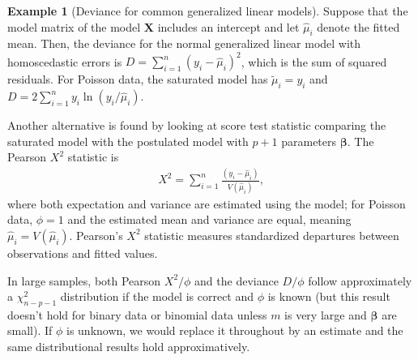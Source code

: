 \documentclass[
  11pt,
  letterpaper,
]{book}
\theoremstyle{definition}
\theoremstyle{definition}
\newtheorem{example}{Example}[chapter]
\theoremstyle{definition}
\theoremstyle{remark}
\begin{document}
\begin{example}[Deviance for common generalized linear models]
\protect\hypertarget{exm:devglm}{}{\label{exm:devglm} {} }Suppose that the model matrix of the model \(\mathbf{X}\) includes an intercept and let \(\widehat{\mu}_i\) denote the fitted mean. Then, the deviance for the normal generalized linear model with homoscedastic errors is \(D = \sum_{i=1}^n (y_i - \widehat{\mu}_i)^2\), which is the sum of squared residuals. For Poisson data, the saturated model has \(\widetilde{\mu}_i=y_i\) and \(D= 2\sum_{i=1}^n y_i \ln(y_i/\widehat{\mu}_i)\).
\end{example}

Another alternative is found by looking at score test statistic comparing the saturated model with the postulated model with \(p+1\) parameters \(\boldsymbol{\beta}\). The Pearson \(X^2\) statistic is
\begin{align*}
 X^2= \sum_{i=1}^n \frac{(y_i-\widehat{\mu}_i)}{ V(\widehat{\mu}_i)},
\end{align*}
where both expectation and variance are estimated using the model; for Poisson data, \(\phi=1\) and the estimated mean and variance are equal, meaning \(\widehat{\mu}_i=V(\widehat{\mu}_i)\). Pearson's \(X^2\) statistic measures standardized departures between observations and fitted values.

In large samples, both Pearson \(X^2/\phi\) and the deviance \(D/\phi\) follow approximately a \(\chi^2_{n-p-1}\) distribution if the model is correct and \(\phi\) is known (but this result doesn't hold for binary data or binomial data unless \(m\) is very large and \(\boldsymbol{\beta}\) are small). If \(\phi\) is unknown, we would replace it throughout by an estimate and the same distributional results hold approximatively.
\end{document}
